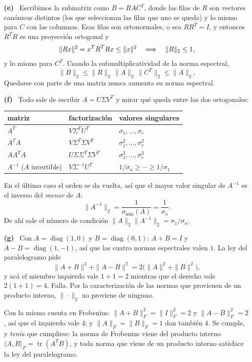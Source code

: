 \documentclass[11pt,a4paper]{article}
\DeclareMathOperator{\tr}{tr}
\DeclareMathOperator{\diag}{diag}
\newcommand{\itemsol}[1]{\par\medskip\noindent\textbf{(#1)}\ \ignorespaces}
\begin{document}
\itemsol{e} Escribimos la submatriz como $B=RAC^T$, donde las filas de $R$ son
vectores canónicos distintos (los que seleccionan las filas que uno se queda) y
lo mismo para $C$ con las columnas. Esas filas son ortonormales, o sea $RR^T=I$,
y entonces $R^TR$ es una proyección ortogonal y
\[
\|Rx\|^{2}=x^TR^TRx\le\|x\|^{2}
\quad\Longrightarrow\quad \|R\|_2\le1 ,
\]
y lo mismo para $C^T$. Usando la submultiplicatividad de la norma espectral,
\[
\|B\|_2\le\|R\|_2\,\|A\|_2\,\|C^T\|_2\le\|A\|_2 .
\]
Quedarse con parte de una matriz nunca aumenta su norma espectral.

\itemsol{f} Todo sale de escribir $A=U\Sigma V^T$ y mirar qué queda entre las dos
ortogonales:
\begin{center}
\begin{tabular}{@{}lll@{}}
\hline
matriz & factorización & valores singulares\\
\hline
$A^T$ & $V\Sigma^TU^T$ & $\sigma_1,\dots,\sigma_r$\\
$A^TA$ & $V\Sigma^T\Sigma V^T$ & $\sigma_1^2,\dots,\sigma_r^2$\\
$AA^TA$ & $U\Sigma\Sigma^T\Sigma V^T$ & $\sigma_1^3,\dots,\sigma_r^3$\\
$A^{-1}$ ($A$ invertible) & $V\Sigma^{-1}U^T$ &
$1/\sigma_n\ge\cdots\ge1/\sigma_1$\\
\hline
\end{tabular}
\end{center}
En el último caso el orden se da vuelta, así que el mayor valor singular de
$A^{-1}$ es el inverso del \emph{menor} de $A$:
\[
\|A^{-1}\|_2=\frac{1}{\sigma_{\min}(A)}=\frac{1}{\sigma_n}.
\]
De ahí sale el número de condición $\|A\|_2\|A^{-1}\|_2=\sigma_1/\sigma_n$.

\itemsol{g} Con $A=\diag(1,0)$ y $B=\diag(0,1)$: $A+B=I$ y $A-B=\diag(1,-1)$, así
que las cuatro normas espectrales valen $1$. La ley del paralelogramo pide
\[
\|A+B\|^{2}+\|A-B\|^{2}=2\big(\|A\|^{2}+\|B\|^{2}\big),
\]
y acá el miembro izquierdo vale $1+1=2$ mientras que el derecho vale
$2(1+1)=4$. Falla. Por la caracterización de las normas que provienen de un
producto interno, $\|\cdot\|_2$ no proviene de ninguno.

Con la misma cuenta en Frobenius: $\|A+B\|_F^2=\|I\|_F^2=2$ y $\|A-B\|_F^2=2$,
así que el izquierdo vale $4$; y $\|A\|_F=\|B\|_F=1$ dan también $4$. Se cumple,
y \emph{tenía} que cumplirse: la norma de Frobenius viene del producto interno
$\langle A,B\rangle_F=\tr(A^TB)$, y toda norma que viene de un producto interno
satisface la ley del paralelogramo.
\end{document}
